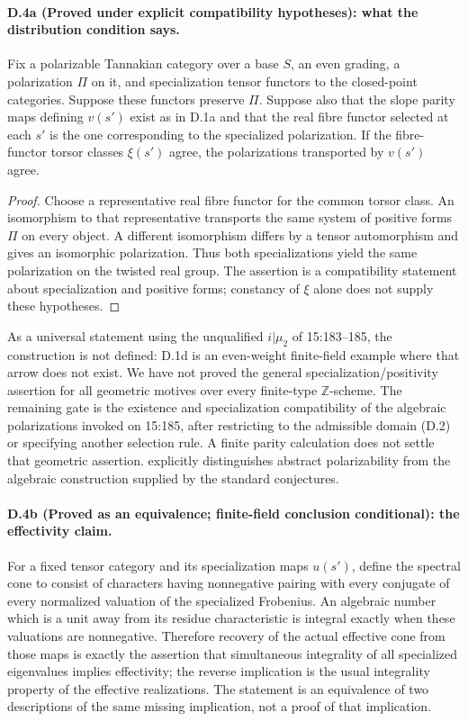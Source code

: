 \paragraph{D.4a (Proved under explicit compatibility hypotheses): what the distribution condition says.}
Fix a polarizable Tannakian category over a base $S$, an even grading,
a polarization $\Pi$ on it, and specialization tensor functors to the
closed-point categories. Suppose these functors preserve $\Pi$. Suppose
also that the slope parity maps defining $v(s')$ exist as in D.1a and
that the real fibre functor selected at each $s'$ is the one corresponding
to the specialized polarization. If the fibre-functor torsor classes
$\xi(s')$ agree, the polarizations transported by $v(s')$ agree.

\begin{proof}
Choose a representative real fibre functor for the common torsor class.
An isomorphism to that representative transports the same system of
positive forms $\Pi$ on every object. A different isomorphism differs
by a tensor automorphism and gives an isomorphic polarization. Thus both
specializations yield the same polarization on the twisted real group.
The assertion is a compatibility statement about specialization and
positive forms; constancy of $\xi$ alone does not supply these hypotheses.
\end{proof}

As a universal statement using the unqualified $i|\mu _2$ of 15:183--185,
the construction is not defined: D.1d is an even-weight finite-field
example where that arrow does not exist. We have not proved the general
specialization/positivity assertion for all geometric motives over every
finite-type $\mathbb Z$-scheme. The remaining gate is the existence and
specialization compatibility of the algebraic polarizations invoked on
15:185, after restricting to the admissible domain (D.2) or specifying
another selection rule. A finite parity calculation does not settle that
geometric assertion. \citet[Remark 2.47]{Milne1994} explicitly distinguishes
abstract polarizability from the algebraic construction supplied by the
standard conjectures.

\paragraph{D.4b (Proved as an equivalence; finite-field conclusion conditional): the effectivity claim.}
For a fixed tensor category and its specialization maps $u(s')$, define the
spectral cone to consist of characters having nonnegative pairing with
every conjugate of every normalized valuation of the specialized Frobenius.
An algebraic number which is a unit away from its residue characteristic
is integral exactly when these valuations are nonnegative. Therefore
recovery of the actual effective cone from those maps is exactly the
assertion that simultaneous integrality of all specialized eigenvalues
implies effectivity; the reverse implication is the usual integrality
property of the effective realizations. The statement is an equivalence
of two descriptions of the same missing implication, not a proof of that
implication.

